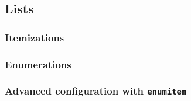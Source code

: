 \subsection{Lists}
\subsubsection{Itemizations}
\subsubsection{Enumerations}
\subsubsection{Advanced configuration with \texttt{enumitem}}
